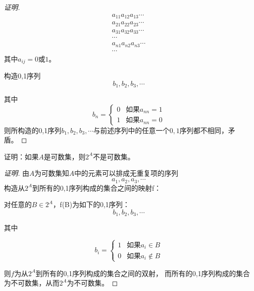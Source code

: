 \documentclass{article}
\begin{document}
\begin{CJK}{UTF8}{gbsn}
\begin{proof}[证明]
  \begin{align*}
    a_{11}a_{12}a_{13}\cdots\\
    a_{21}a_{22}a_{23}\cdots\\
    a_{31}a_{32}a_{33}\cdots\\
    \cdots\\
    a_{n1}a_{n2}a_{n3}\cdots\\
    \cdots
  \end{align*}
  其中$a_{ij}=0$或$1$。

  构造0,1序列
\[b_1,b_2,b_3,\cdots\]

其中
\[b_n=
\begin{cases}
  0&\text{如果}a_{nn}=1\\
  1&\text{如果}a_{nn}=0
\end{cases}\]
则所构造的0,1序列$b_1,b_2,b_3,\cdots$与前述序列中的任意一个$0,1$序列都不相同，矛盾。
\end{proof}
\begin{Exercise}
  证明：如果$A$是可数集，则$2^A$不是可数集。
\end{Exercise}
\begin{proof}[证明]
  由$A$为可数集知$A$中的元素可以排成无重复项的序列
  \[a_1,a_2,a_3,\cdots\]
  构造从$2^A$到所有的0,1序列构成的集合之间的映射f：

  对任意的$B\in 2^A$，f(B)为如下的0,1序列：
  \[b_1,b_2,b_3,\cdots\]

  其中

  \[b_i=\begin{cases}
    1& \text{如果}a_i\in B\\
    0& \text{如果}a_i\notin B
  \end{cases}\]
  
  则$f$为从$2^A$到所有的0,1序列构成的集合之间的双射，
  而所有的0,1序列构成的集合为不可数集，从而$2^A$为不可数集。
\end{proof}
\end{CJK}
\end{document}

